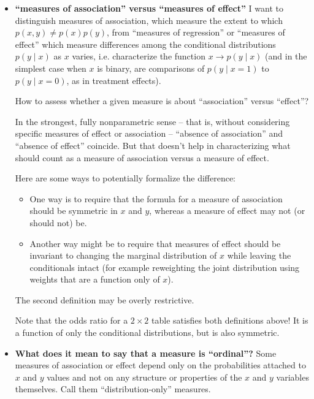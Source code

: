 \documentclass[
  11pt,
  fleqn
]{article}
\begin{document}
\begin{itemize}

  \item \textbf{``measures of association''
    versus ``measures of effect''}
    I want to distinguish measures of association, which measure the
    extent to which $p(x, y)
    \neq p(x)p(y)$, from ``measures of regression'' or ``measures of
    effect'' which measure differences among the conditional
    distributions $p(y \mid x)$ as $x$ varies, i.e.
    characterize the function $x \rightarrow p(y \mid x)$ (and in the
      simplest case when $x$ is binary, are comparisons of $p(y \mid
    x=1)$ to $p(y \mid x=0)$, as in treatment effects).

    How to assess whether a given measure is about ``association''
    versus ``effect''?

    In the strongest, fully nonparametric sense -- that is, without
    considering specific measures of effect or association -- ``absence of
    association'' and ``absence of effect'' coincide. But that
    doesn't help in characterizing what should count as a measure of
    association versus a measure of effect.

    Here are some ways to potentially formalize the difference:

    \begin{itemize}

      \item One way is to require that the formula for a measure
        of association should be symmetric in $x$ and $y$, whereas a
        measure of effect may not (or should not) be.

      \item Another way might be to require that measures of effect should be
        invariant to changing the marginal distribution of $x$ while leaving the
        conditionals intact (for example reweighting the joint
          distribution using
        weights that are a function only of $x$).

    \end{itemize}
    The second definition may be overly restrictive.

    Note that the odds ratio for a $2\times 2$ table satisfies both
    definitions above! It is a function of only the conditional
    distributions, but is also symmetric.

  \item \textbf{What does it mean to say that a measure is
    ``ordinal''?} Some measures of association or effect
    depend only on the probabilities attached to $x$ and
    $y$ values and not on any structure or properties of the $x$ and
    $y$ variables themselves. Call them ``distribution-only'' measures.


\end{itemize}
\end{document}

